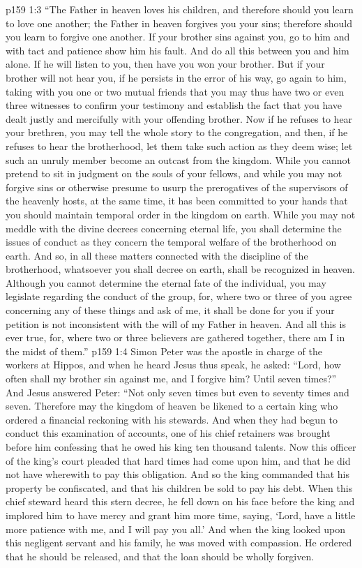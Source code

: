 \vs p159 1:3 \textcolor{ubdarkred}{“The Father in heaven loves his children, and therefore should you learn to love one another; the Father in heaven forgives you your sins; therefore should you learn to forgive one another. If your brother sins against you, go to him and with tact and patience show him his fault. And do all this between you and him alone. If he will listen to you, then have you won your brother. But if your brother will not hear you, if he persists in the error of his way, go again to him, taking with you one or two mutual friends that you may thus have two or even three witnesses to confirm your testimony and establish the fact that you have dealt justly and mercifully with your offending brother. Now if he refuses to hear your brethren, you may tell the whole story to the congregation, and then, if he refuses to hear the brotherhood, let them take such action as they deem wise; let such an unruly member become an outcast from the kingdom. While you cannot pretend to sit in judgment on the souls of your fellows, and while you may not forgive sins or otherwise presume to usurp the prerogatives of the supervisors of the heavenly hosts, at the same time, it has been committed to your hands that you should maintain temporal order in the kingdom on earth. While you may not meddle with the divine decrees concerning eternal life, you shall determine the issues of conduct as they concern the temporal welfare of the brotherhood on earth. And so, in all these matters connected with the discipline of the brotherhood, whatsoever you shall decree on earth, shall be recognized in heaven. Although you cannot determine the eternal fate of the individual, you may legislate regarding the conduct of the group, for, where two or three of you agree concerning any of these things and ask of me, it shall be done for you if your petition is not inconsistent with the will of my Father in heaven. And all this is ever true, for, where two or three believers are gathered together, there am I in the midst of them.”}
\pc \vs p159 1:4 Simon Peter was the apostle in charge of the workers at Hippos, and when he heard Jesus thus speak, he asked: “Lord, how often shall my brother sin against me, and I forgive him? Until seven times?” And Jesus answered Peter: \textcolor{ubdarkred}{“Not only seven times but even to seventy times and seven. Therefore may the kingdom of heaven be likened to a certain king who ordered a financial reckoning with his stewards. And when they had begun to conduct this examination of accounts, one of his chief retainers was brought before him confessing that he owed his king ten thousand talents. Now this officer of the king’s court pleaded that hard times had come upon him, and that he did not have wherewith to pay this obligation. And so the king commanded that his property be confiscated, and that his children be sold to pay his debt. When this chief steward heard this stern decree, he fell down on his face before the king and implored him to have mercy and grant him more time, saying, ‘Lord, have a little more patience with me, and I will pay you all.’ And when the king looked upon this negligent servant and his family, he was moved with compassion. He ordered that he should be released, and that the loan should be wholly forgiven.}
